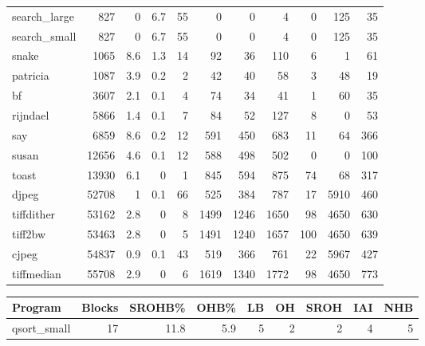 \begin{tabular}{lrrrrrrrrrr}
 search\_large    &            827 &      0   &    6.7 &   55 &      0 &          0 &            4 &     0 &   125 &    35 \\
 search\_small    &            827 &      0   &    6.7 &   55 &      0 &          0 &            4 &     0 &   125 &    35 \\
 snake           &           1065 &      8.6 &    1.3 &   14 &     92 &         36 &          110 &     6 &     1 &    61 \\
 patricia        &           1087 &      3.9 &    0.2 &    2 &     42 &         40 &           58 &     3 &    48 &    19 \\
 bf              &           3607 &      2.1 &    0.1 &    4 &     74 &         34 &           41 &     1 &    60 &    35 \\
 rijndael        &           5866 &      1.4 &    0.1 &    7 &     84 &         52 &          127 &     8 &     0 &    53 \\
 say             &           6859 &      8.6 &    0.2 &   12 &    591 &        450 &          683 &    11 &    64 &   366 \\
 susan           &          12656 &      4.6 &    0.1 &   12 &    588 &        498 &          502 &     0 &     0 &   100 \\
 toast           &          13930 &      6.1 &    0   &    1 &    845 &        594 &          875 &    74 &    68 &   317 \\
 djpeg           &          52708 &      1   &    0.1 &   66 &    525 &        384 &          787 &    17 &  5910 &   460 \\
 tiffdither      &          53162 &      2.8 &    0   &    8 &   1499 &       1246 &         1650 &    98 &  4650 &   630 \\
 tiff2bw         &          53463 &      2.8 &    0   &    5 &   1491 &       1240 &         1657 &   100 &  4650 &   639 \\
 cjpeg           &          54837 &      0.9 &    0.1 &   43 &    519 &        366 &          761 &    22 &  5967 &   427 \\
 tiffmedian      &          55708 &      2.9 &    0   &    6 &   1619 &       1340 &         1772 &    98 &  4650 &   773 \\
\hline
\end{tabular}\begin{tabular}{lrrrrrrrr}
\hline
 Program         &   Blocks &   SROHB\% &   OHB\% &   LB &   OH &   SROH &   IAI &   NHB \\
\hline
 qsort\_small     &       17 &     11.8 &    5.9 &    5 &    2 &      2 &     4 &     5 \\

\end{tabular}
